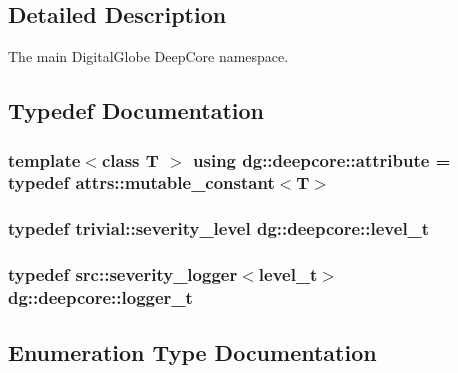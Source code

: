 \subsection{Detailed Description}
The main Digital\+Globe Deep\+Core namespace. 

\subsection{Typedef Documentation}
\subsubsection[{\texorpdfstring{attribute}{attribute}}]{\setlength{\rightskip}{0pt plus 5cm}template$<$class T $>$ using {\bf dg\+::deepcore\+::attribute} = typedef attrs\+::mutable\+\_\+constant$<$T$>$}\hypertarget{namespacedg_1_1deepcore_abfee748fb46325389237ecd4d1d7f21b}{}\label{namespacedg_1_1deepcore_abfee748fb46325389237ecd4d1d7f21b}
\subsubsection[{\texorpdfstring{level\+\_\+t}{level_t}}]{\setlength{\rightskip}{0pt plus 5cm}typedef trivial\+::severity\+\_\+level {\bf dg\+::deepcore\+::level\+\_\+t}}\hypertarget{namespacedg_1_1deepcore_ac108b40b3a6b8e3450281eb787e27d6b}{}\label{namespacedg_1_1deepcore_ac108b40b3a6b8e3450281eb787e27d6b}
\subsubsection[{\texorpdfstring{logger\+\_\+t}{logger_t}}]{\setlength{\rightskip}{0pt plus 5cm}typedef src\+::severity\+\_\+logger$<${\bf level\+\_\+t}$>$ {\bf dg\+::deepcore\+::logger\+\_\+t}}\hypertarget{namespacedg_1_1deepcore_acaeda2fb8a475fd1de2ef14ac9ec7a2f}{}\label{namespacedg_1_1deepcore_acaeda2fb8a475fd1de2ef14ac9ec7a2f}


\subsection{Enumeration Type Documentation}
